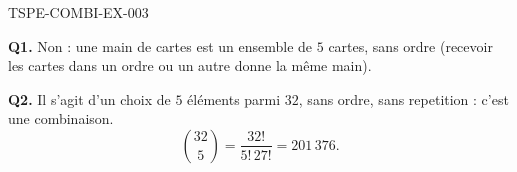 \begin{corrige}{TSPE-COMBI-EX-003}

\textbf{Q1.} Non : une main de cartes est un ensemble de $5$ cartes, sans ordre (recevoir les cartes dans un ordre ou un autre donne la même main).

\textbf{Q2.} Il s'agit d'un choix de $5$ éléments parmi $32$, sans ordre, sans repetition : c'est une combinaison.
\[
  \binom{32}{5} = \frac{32!}{5!\,27!} = \boxed{201\,376}.
\]

\end{corrige}
